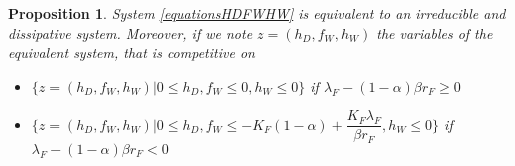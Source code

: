 \documentclass{article}
\newcommand{\lfw}{\lambda_{F}}
\newcommand{\lfw}{\lambda_{F}}
\newtheorem{prop}{Proposition}
\begin{document}
\begin{prop} \label{equivalentSystem}
System \eqref{equationsHDFWHW} is equivalent to an irreducible and dissipative system. Moreover, if we note $z = (h_D, f_W, h_W)$ the variables of the equivalent system, that is competitive on
\begin{itemize}
\item $\Big\{z = (h_D, f_W, h_W) | 0 \leq h_D, f_W  \leq 0, h_W \leq 0 \Big\}$ if $\lfw - (1-\alpha)\beta r_F \geq 0$
\item $\Big\{z = (h_D, f_W, h_W) | 0 \leq h_D, f_W \leq -K_F(1-\alpha) + \dfrac{K_F \lfw}{\beta r_F} , h_W \leq 0 \Big\}$ if $\lfw - (1-\alpha)\beta r_F < 0$
\end{itemize}

\end{prop}
\end{document}
